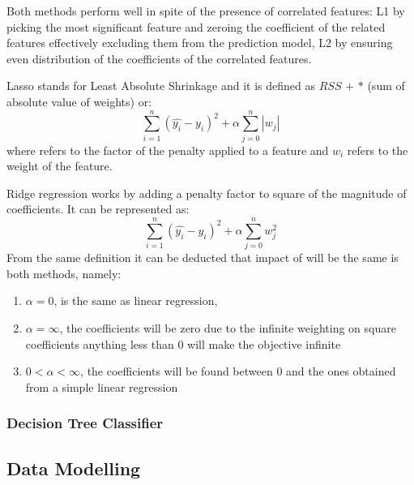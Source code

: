 Both methods perform well in spite of the presence of correlated features: L1 by picking the most significant feature and zeroing the coefficient of the related features effectively excluding them from the prediction model, L2 by ensuring even distribution of the coefficients of the correlated features. 

Lasso stands for Least Absolute Shrinkage and it is defined as $RSS$ $+$ \textalpha{} $*$ (sum of absolute value of weights) or:
\begin{equation}\label{eq_lasso}
\sum^n_{i=1}(\hat{y_i}- y_i)^2 + \alpha \sum^n_{j=0}|w_j|
\end{equation}
where \textalpha{} refers to the factor of the penalty applied to a feature and $w_i$ refers to the weight of the feature\cite{Hastie2009SpringerOfLasso}.

Ridge regression works by adding a penalty factor to square of the magnitude of coefficients\cite{Hastie2009SpringerOfRidge}. It can be represented as:
\begin{equation}\label{eq_ridge}
\sum^n_{i=1}(\hat{y_i}- y_i)^2 + \alpha \sum^n_{j=0}w_j^2
\end{equation}
From the same definition it can be deducted that impact of \textalpha{} will be the same is both methods, namely:
\begin{enumerate}\label{list:impact-of-alpha}
\itemsep0em
\item\label{it:item1} $\alpha = 0$, is the same as linear regression, 
\item\label{it:item2} $\alpha = \infty$, the coefficients will be zero due to the infinite weighting on square coefficients anything less than 0 will make the objective infinite
\item\label{it:item3} $0 < \alpha < \infty$, the coefficients will be found between 0 and the ones obtained from a simple linear regression
\end{enumerate}

\subsubsection{Decision Tree Classifier}

\subsection{Data Modelling}

